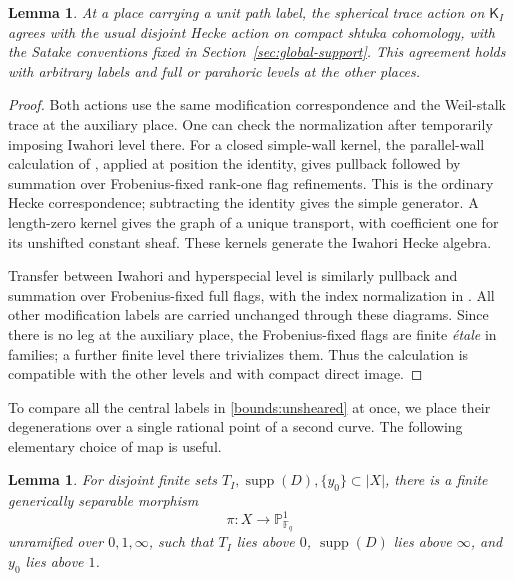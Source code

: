 \documentclass[11pt]{article}
\numberwithin{equation}{section}
\newtheorem{lemma}[theorem]{Lemma}
\theoremstyle{definition}
\theoremstyle{remark}
\newcommand{\F}{\mathbb F}
\newcommand{\supp}{\operatorname{supp}}
\begin{document}
\begin{lemma}\label{bounds:disjoint-hecke}
At a place carrying a unit path label, the spherical trace action on
$\mathsf K_I$ agrees with the usual disjoint Hecke action on compact
shtuka cohomology, with the Satake conventions fixed in
Section~\ref{sec:global-support}.  This agreement holds with arbitrary
labels and full or parahoric levels at the other places.
\end{lemma}

\begin{proof}
Both actions use the same modification correspondence and the
Weil-stalk trace at the auxiliary place.  One can check the normalization
after temporarily imposing Iwahori level there.  For a closed simple-wall
kernel, the parallel-wall calculation of \cite[Proposition~2.6]{Parent},
applied at position the identity, gives pullback
followed by summation over Frobenius-fixed rank-one flag refinements.
This is the ordinary Hecke correspondence; subtracting the identity
gives the simple generator.  A length-zero kernel gives the graph of a
unique transport, with coefficient one for its unshifted constant
sheaf.  These kernels generate the Iwahori Hecke algebra.

Transfer between Iwahori and hyperspecial level is similarly pullback
and summation over Frobenius-fixed full flags, with the index
normalization in \cite[Proposition~2.6]{Parent}.  All other modification labels
are carried unchanged through these diagrams.  Since there is no leg at
the auxiliary place, the Frobenius-fixed flags are finite \emph{\'etale}
in families; a further finite level there trivializes them.  Thus the
calculation is compatible with the other levels and with compact direct
image.
\end{proof}

To compare all the central labels in \eqref{bounds:unsheared} at once, we
place their degenerations over a single rational point of a second
curve.  The following elementary choice of map is useful.

\begin{lemma}\label{bounds:curve-map}
For disjoint finite sets $T_I,\supp(D),\{y_0\}\subset|X|$, there is a
finite generically separable morphism
\[
 \pi:X\longrightarrow\mathbb P^1_{\F_q}
\]
unramified over $0,1,\infty$, such that $T_I$ lies above $0$, $\supp(D)$
lies above $\infty$, and $y_0$ lies above $1$.
\end{lemma}
\end{document}
